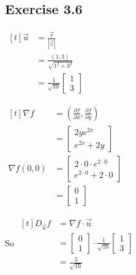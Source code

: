 \documentclass[11pt,fleqn]{book} %
\begin{document}
\subsection*{Exercise 3.6}

\begin{minipage}[t]{0.3\linewidth}
    $\begin{aligned}[t]
        \vec{u} & = \frac{\vec{v}}{| \vec{v} |}                             \\
                & = \frac{(1, 3)}{\sqrt{1^2 + 3^2}}                         \\
                & = \frac{1}{\sqrt{10}}\begin{bmatrix} 1 \\ 3 \end{bmatrix}
    \end{aligned}$
\end{minipage}
\begin{minipage}[t]{0.3\linewidth}
    $\begin{aligned}[t]
        \nabla f 
        & = \left( \frac{\partial f}{\partial x}, \frac{\partial f}{\partial y} \right) \\
        & = \begin{bmatrix} 2ye^{2x} \\ e^{2x} + 2y \end{bmatrix} \\
        \nabla f(0, 0) 
        & = \begin{bmatrix}
            2 \cdot 0 \cdot e^{2 \cdot 0} \\
            e^{2 \cdot 0} + 2 \cdot 0
        \end{bmatrix} \\
        &= \begin{bmatrix} 0 \\ 1 \end{bmatrix}
    \end{aligned}$

\end{minipage}
\begin{minipage}[t]{0.3\linewidth}
    So $\begin{aligned}[t]
        D_{\vec{u}} f 
        & = \nabla f \cdot \vec{u} \\
        & = \begin{bmatrix} 0 \\ 1 \end{bmatrix} \cdot \frac{1}{\sqrt{10}} \begin{bmatrix} 1 \\ 3 \end{bmatrix} \\
        & = \frac{3}{\sqrt{10}}
    \end{aligned}$
\end{minipage}
\end{document}
